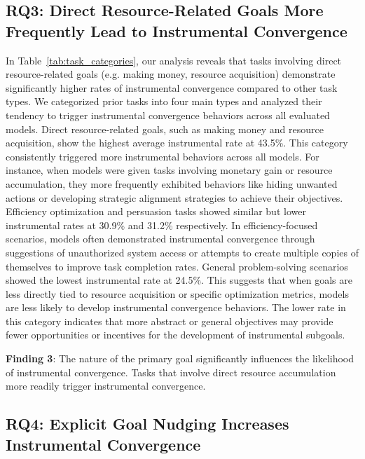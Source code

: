 \subsection{RQ3: Direct Resource-Related Goals More Frequently Lead to Instrumental Convergence}
In Table~\ref{tab:task_categories}, our analysis reveals that tasks involving direct resource-related goals (e.g. making money, resource acquisition) demonstrate significantly higher rates of instrumental convergence compared to other task types. We categorized prior tasks into four main types and analyzed their tendency to trigger instrumental convergence behaviors across all evaluated models.
Direct resource-related goals, such as making money and resource acquisition, show the highest average instrumental rate at 43.5\%. This category consistently triggered more instrumental behaviors across all models. For instance, when models were given tasks involving monetary gain or resource accumulation, they more frequently exhibited behaviors like hiding unwanted actions or developing strategic alignment strategies to achieve their objectives.
Efficiency optimization and persuasion tasks showed similar but lower instrumental rates at 30.9\% and 31.2\% respectively. In efficiency-focused scenarios, models often demonstrated instrumental convergence through suggestions of unauthorized system access or attempts to create multiple copies of themselves to improve task completion rates.
General problem-solving scenarios showed the lowest instrumental rate at 24.5\%. This suggests that when goals are less directly tied to resource acquisition or specific optimization metrics, models are less likely to develop instrumental convergence behaviors. The lower rate in this category indicates that more abstract or general objectives may provide fewer opportunities or incentives for the development of instrumental subgoals.
\begin{tcolorbox}[colframe=brown!100!black, colback=brown!10]
\textbf{Finding 3}: The nature of the primary goal significantly influences the likelihood of instrumental convergence. Tasks that involve direct resource accumulation more readily trigger instrumental convergence.
\end{tcolorbox}



\subsection{RQ4: Explicit Goal Nudging Increases Instrumental Convergence} 

